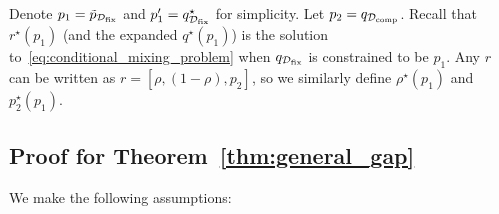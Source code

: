 Denote $p_1 = \tilde{p}_{\mathcal{D}_{\text{fix}}}$ and $p_1' = q^\star_{\mathcal{D}_{\text{fix}}}$ for simplicity. Let $p_2 = q_{\mathcal{D}_{\text{comp}}}$. Recall that $r^\star(p_1)$ (and the expanded $q^\star(p_1)$) is the solution to~\eqref{eq:conditional_mixing_problem} when $q_{\mathcal{D}_{\text{fix}}}$ is constrained to be $p_1$. 
Any $r$ can be written as $r = [\rho, (1 - \rho), p_2]$, so we similarly define $\rho^\star(p_1)$ and $p_2^\star(p_1)$.


\subsection{Proof for Theorem~\ref{thm:general_gap}}\label{supp:general_gap_proof}

\begin{assumption}\label{ass:1}
    We make the following assumptions:
    \begin{enumerate}
    

\end{enumerate}
\end{assumption}
